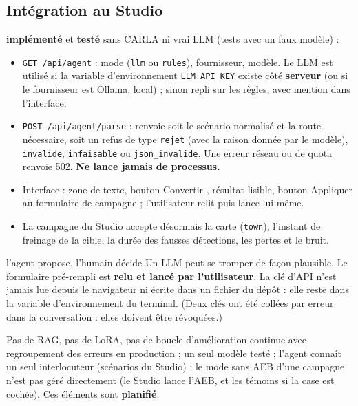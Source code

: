 \documentclass[11pt,a4paper]{article}
\providecommand{\og}{\guillemotleft\nobreakspace}
\providecommand{\fg}{\nobreakspace\guillemotright}
\newcommand{\impl}{\textcolor{warnc}{\textbf{impl\'ement\'e}}}
\newcommand{\teste}{\textcolor{accent}{\textbf{test\'e}}}
\newcommand{\plan}{\textcolor{badc}{\textbf{planifi\'e}}}
\newcommand{\code}[1]{\texttt{#1}}
\begin{document}
\subsection{Int\'egration au Studio}
\impl{} et \teste{} sans CARLA ni vrai LLM (tests avec un faux mod\`ele) :
\begin{itemize}
\item \code{GET /api/agent} : mode (\code{llm} ou \code{rules}), fournisseur, mod\`ele. Le LLM est utilis\'e si la variable d'environnement \code{LLM\_API\_KEY} existe c\^ot\'e \textbf{serveur} (ou si le fournisseur est Ollama, local) ; sinon repli sur les r\`egles, avec mention dans l'interface.
\item \code{POST /api/agent/parse} : renvoie soit le sc\'enario normalis\'e et la route n\'ecessaire, soit un refus de type \code{rejet} (avec la raison donn\'ee par le mod\`ele), \code{invalide}, \code{infaisable} ou \code{json\_invalide}. Une erreur r\'eseau ou de quota renvoie 502. \textbf{Ne lance jamais de processus.}
\item Interface : zone de texte, bouton \og Convertir \fg, r\'esultat lisible, bouton \og Appliquer au formulaire de campagne \fg{} ; l'utilisateur relit puis lance lui-m\^eme.
\item La campagne du Studio accepte d\'esormais la carte (\code{town}), l'instant de freinage de la cible, la dur\'ee des fausses d\'etections, les pertes et le bruit.
\end{itemize}
\begin{choix}{l'agent propose, l'humain d\'ecide}
Un LLM peut se tromper de fa\c con plausible. Le formulaire pr\'e-rempli est \textbf{relu et lanc\'e par l'utilisateur}. La cl\'e d'API n'est jamais lue depuis le navigateur ni \'ecrite dans un fichier du d\'ep\^ot :
elle reste dans la variable d'environnement du terminal. (Deux cl\'es ont \'et\'e coll\'ees par erreur dans la conversation : elles doivent \^etre r\'evoqu\'ees.)
\end{choix}
\begin{limite}
Pas de RAG, pas de LoRA, pas de boucle d'am\'elioration continue avec regroupement des erreurs en production ; un seul mod\`ele test\'e ; l'agent connaît un seul interlocuteur (sc\'enarios du Studio) ; le mode \og sans AEB \fg{} d'une campagne
n'est pas g\'er\'e directement (le Studio lance l'AEB, et les t\'emoins si la case est coch\'ee). Ces \'el\'ements sont \plan.
\end{limite}

\end{document}
